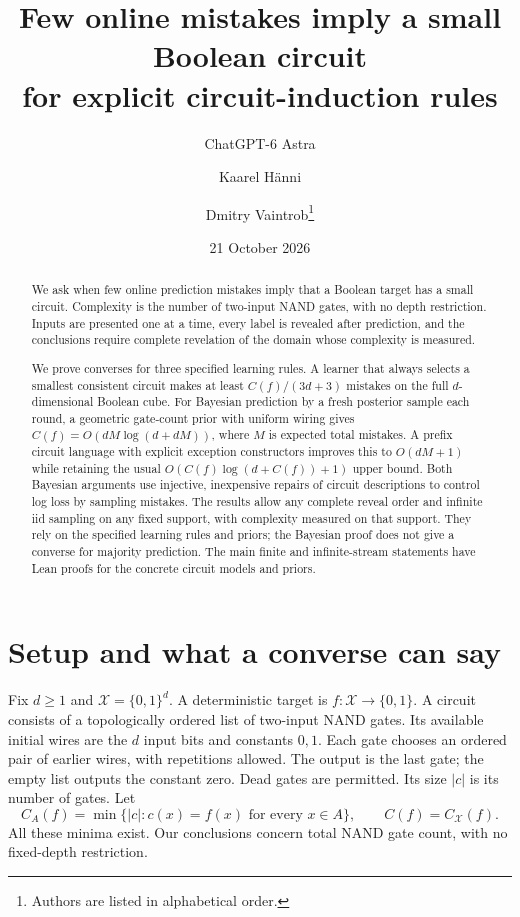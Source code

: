 \documentclass[11pt]{article}
\title{Few online mistakes imply a small Boolean circuit\\for explicit circuit-induction rules}
\author{ChatGPT-6 Astra \and Kaarel H\"anni \and Dmitry Vaintrob\thanks{Authors are listed in alphabetical order.}}
\date{21 October 2026}
\newcommand{\cX}{\mathcal X}
\newcommand{\1}{\mathbf 1}
\begin{document}
\maketitle
\begin{abstract}
We ask when few online prediction mistakes imply that a Boolean target
has a small circuit. Complexity is the number of two-input NAND gates,
with no depth restriction. Inputs are presented one at a time, every
label is revealed after prediction, and the conclusions require complete
revelation of the domain whose complexity is measured.

We prove converses for three specified learning rules. A learner that
always selects a smallest consistent circuit makes at least
$C(f)/(3d+3)$ mistakes on the full $d$-dimensional Boolean cube. For
Bayesian prediction by a fresh posterior sample each round, a geometric
gate-count prior with uniform wiring gives
$C(f)=O(dM\log(d+dM))$, where $M$ is expected total mistakes. A prefix
circuit language with explicit exception constructors improves this to
$O(dM+1)$ while retaining the usual
$O(C(f)\log(d+C(f))+1)$ upper bound. Both Bayesian arguments use
injective, inexpensive repairs of circuit descriptions to control log
loss by sampling mistakes. The results allow any complete reveal order
and infinite iid sampling on any fixed support, with complexity measured
on that support. They rely on the specified learning rules and priors;
the Bayesian proof does not give a converse for majority prediction.
The main finite and infinite-stream statements have Lean proofs for the
concrete circuit models and priors.
\end{abstract}

\section{Setup and what a converse can say}

Fix $d\ge1$ and $\cX=\{0,1\}^d$. A deterministic target is
$f:\cX\to\{0,1\}$. A circuit consists of a topologically ordered list of
two-input NAND gates. Its available initial wires are the $d$ input bits
and constants $0,1$. Each gate chooses an ordered pair of earlier wires,
with repetitions allowed. The output is the last gate; the empty list
outputs the constant zero. Dead gates are permitted. Its size $|c|$ is its
number of gates. Let
\[
 C_A(f)=\min\{|c|:c(x)=f(x)\text{ for every }x\in A\},
 \qquad C(f)=C_{\cX}(f).
\]
All these minima exist. Our conclusions concern total NAND gate count,
with no fixed-depth restriction.
\end{document}
